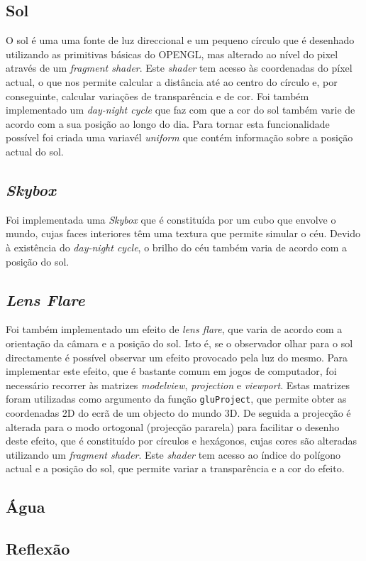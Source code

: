\documentclass[12pt]{article}
\begin{document}
\subsection*{Sol}
O sol é uma uma fonte de luz direccional e um pequeno círculo que é desenhado utilizando as primitivas básicas do OPENGL, mas alterado ao nível do pixel através de um \textit{fragment shader}. Este \textit{shader} tem acesso às coordenadas do píxel actual, o que nos permite calcular a distância até ao centro do círculo e, por conseguinte, calcular variações de transparência e de cor. Foi também implementado um \textit{day-night cycle} que faz com que a cor do sol também varie de acordo com a sua posição ao longo do dia. Para tornar esta funcionalidade possível foi criada uma variavél \textit{uniform} que contém informação sobre a posição actual do sol.
\subsection*{\textit{Skybox}}
Foi implementada uma \textit{Skybox} que é constituída por um cubo que envolve o mundo, cujas faces interiores têm uma textura que permite simular o céu. Devido à existência do \textit{day-night cycle}, o brilho do céu também varia de acordo com a posição do sol.
\subsection*{\textit{Lens Flare}}
Foi também implementado um efeito de \textit{lens flare}, que varia de acordo com a orientação da câmara e a posição do sol. Isto é, se o observador olhar para o sol directamente é possível observar um efeito provocado pela luz do mesmo. Para implementar este efeito, que é bastante comum em jogos de computador, foi necessário recorrer às matrizes \textit{modelview}, \textit{projection} e \textit{viewport}. Estas matrizes foram utilizadas como argumento da função \texttt{gluProject}, que permite obter as coordenadas 2D do ecrã de um objecto do mundo 3D. De seguida a projecção é alterada para o modo ortogonal (projecção pararela) para facilitar o desenho deste efeito, que é constituído por círculos e hexágonos, cujas cores são alteradas utilizando um \textit{fragment shader}. Este \textit{shader} tem acesso ao índice do polígono actual e a posição do sol, que permite variar a transparência e a cor do efeito.
\subsection*{Água}
\subsection*{Reflexão}
\end{document}
